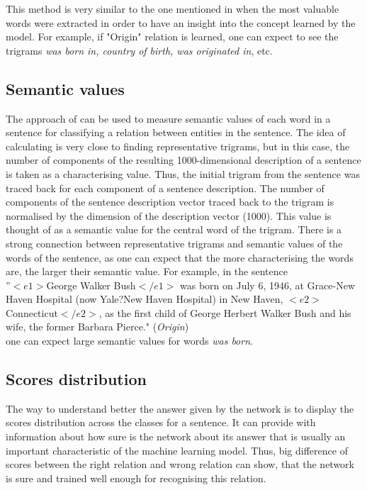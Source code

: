  This method is very similar to the one mentioned in 
 \cite{craven1999constructing} when the most valuable words were extracted in order to 
 have an insight into the concept learned by the model. For example, if "Origin" relation is learned, 
 one can expect to see the trigrams \textit{was born in, country of birth, was originated in}, etc.
 
\subsection{Semantic values}
\label{subs:sem-val}
The approach of \cite{DBLP:journals/corr/ZhangW15a} can be used to measure 
semantic values of each word in a sentence for classifying a relation between entities in the 
sentence. The idea of calculating is very close to finding representative trigrams, but in this case, the 
number of components of the resulting 1000-dimensional description of a sentence is taken 
as a characterising value. Thus, the initial trigram from the sentence was traced back for each component of a sentence description. The number of components of the sentence description 
vector traced back to the trigram is normalised by the dimension of the description vector (1000). 
This value is thought of as a semantic value for the central word of the trigram. There is a strong connection between 
representative trigrams and semantic values of the words of the sentence, as one can 
expect that the more characterising the words are, the larger their semantic value. For example, 
in the sentence 
\\
''$<e1>$George Walker Bush$</e1>$ was born on July 6, 1946, at Grace-New Haven Hospital (now Yale?New Haven Hospital) in New Haven, $<e2>$Connecticut$</e2>$, as the first child of George Herbert Walker Bush and his wife, the former Barbara Pierce." (\textit{Origin})
\\
one can expect large semantic values for words \textit{was born}.

\subsection{Scores distribution}
\label{subs:score-distr}
The way to understand better the answer given by the network is to display the scores distribution across the classes for a sentence. 
It can provide with information about how sure is the network about its answer that is usually 
an important characteristic of the machine learning model. Thus, big difference of scores 
between the right relation and wrong relation can show, that the network is sure and trained well 
enough for recognising this relation.

